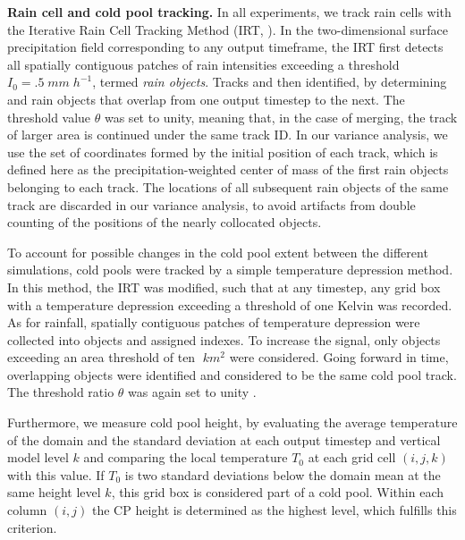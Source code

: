 \documentclass[draft,linenumbers]{agujournal2019}
\begin{document}
\noindent
{\bf Rain cell and cold pool tracking.}
In all experiments, we track rain cells with the Iterative Rain Cell Tracking Method (IRT, \cite{moseley2019statistical}).
In the two-dimensional surface precipitation field corresponding to any output timeframe, the IRT first detects all spatially contiguous patches of rain intensities exceeding a threshold $I_0=.5\;mm\;h^{-1}$, termed {\it rain objects}.
Tracks and then identified, by determining and rain objects that overlap from one output timestep to the next. 
The threshold value $\theta$ was set to unity, meaning that, in the case of merging, the track of larger area is continued under the same track ID.
In our variance analysis, we use the set of coordinates formed by the initial position of each track, which is defined here as the precipitation-weighted center of mass of the first rain objects belonging to each track.
The locations of all subsequent rain objects of the same track are discarded in our variance analysis, to avoid artifacts from double counting of the positions of the nearly collocated objects.

To account for possible changes in the cold pool extent between the different simulations, cold pools were tracked by a simple temperature depression method.
In this method, the IRT was modified, such that at any timestep, any grid box with a temperature depression exceeding a threshold of one Kelvin was recorded.
As for rainfall, spatially contiguous patches of temperature depression were collected into objects and assigned indexes.
To increase the signal, only objects exceeding an area threshold of ten $\;km^2$ were considered.
Going forward in time, overlapping objects were identified and considered to be the same cold pool track.
The threshold ratio $\theta$ was again set to unity \cite{moseley2019statistical}.

Furthermore, we measure cold pool height, by evaluating the average temperature of the domain and the standard deviation at each output timestep and vertical model level $k$ and comparing the local temperature $T_0$ at each grid cell $(i,j,k)$ with this value.
If $T_0$ is two standard deviations below the domain mean at the same height level $k$, this grid box is considered part of a cold pool. 
Within each column $(i,j)$ the CP height is determined as the highest level, which fulfills this criterion.
\end{document}
